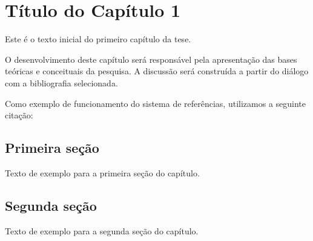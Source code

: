 \chapter{Título do Capítulo 1}

Este é o texto inicial do primeiro capítulo da tese.

O desenvolvimento deste capítulo será responsável pela apresentação
das bases teóricas e conceituais da pesquisa. A discussão será construída
a partir do diálogo com a bibliografia selecionada.

Como exemplo de funcionamento do sistema de referências, utilizamos a
seguinte citação:

\cite{dask1}

\section{Primeira seção}

Texto de exemplo para a primeira seção do capítulo.

\section{Segunda seção}

Texto de exemplo para a segunda seção do capítulo.